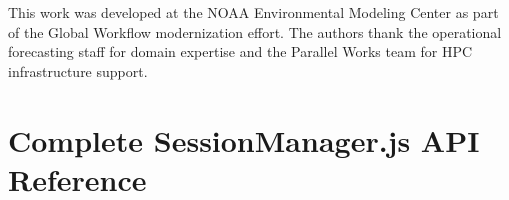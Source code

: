 \documentclass[11pt,letterpaper]{article}
\begin{document}
This work was developed at the NOAA Environmental Modeling Center as part
of the Global Workflow modernization effort.  The authors thank the
operational forecasting staff for domain expertise and the Parallel Works
team for HPC infrastructure support.




\newpage
\appendix

\section{Complete SessionManager.js API Reference}
\label{app:api}
\end{document}

